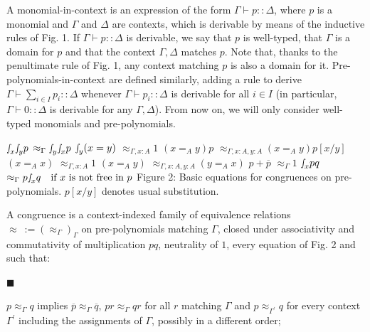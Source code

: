 \documentclass[10pt,a4paper]{amsart}
\begin{document}
 
 
A monomial-in-context is an expression of the form $\Gamma\vdash p::\Delta$, where $p$ is a monomial and $\Gamma$ and $\Delta$ are contexts, which is derivable by means of the inductive rules of Fig. 1. If $\Gamma\vdash p::\Delta$ is derivable, we say that $p$ is well-typed, that $\Gamma$ is a domain for $p$ and that the context $\Gamma,\Delta$ matches $p$. Note that, thanks to the penultimate rule of Fig. 1, any context matching $p$ is also a domain for it. Pre-polynomials-in-context are defined similarly, adding a rule to derive $\Gamma\vdash\sum_{i\in I}p_{i}::\Delta$ whenever $\Gamma\vdash p_{i}::\Delta$ is derivable for all $i\in I$ (in particular, $\Gamma\vdash 0::\Delta$ is derivable for any $\Gamma,\Delta$). From now on, we will only consider well-typed monomials and pre-polynomials.\par
 
 
    $\displaystyle{\smallint\!}_{x}{\smallint\!}_{y}p$ $\displaystyle\approx_{\Gamma}{\smallint\!}_{y}{\smallint\!}_{x}p$ $\displaystyle{\smallint\!}_{y}(x=y)$ $\displaystyle\approx_{\Gamma,x:A}1$     $\displaystyle(x=_{A}y)p$ $\displaystyle\approx_{\Gamma,x:A,y:A}(x=_{A}y)p[x/y]$ $\displaystyle(x=_{A}x)$ $\displaystyle\approx_{\Gamma,x:A}1$     $\displaystyle(x=_{A}y)$ $\displaystyle\approx_{\Gamma,x:A,y:A}(y=_{A}x)$ $\displaystyle p+\overline{p}$ $\displaystyle\approx_{\Gamma}1$     $\displaystyle{\smallint\!}_{x}pq$ $\displaystyle\approx_{\Gamma}p{\smallint\!}_{x}q\quad\text{if $x$ is not free %
in $p$}$    
Figure 2: Basic equations for congruences on pre-polynomials. $p[x/y]$ denotes usual substitution.\par
 
 
 
A congruence is a context-indexed family of equivalence relations $\approx\ :=(\approx_{\Gamma})_{\Gamma}$ on pre-polynomials matching $\Gamma$, closed under associativity and commutativity of multiplication $pq$, neutrality of $1$, every equation of Fig. 2 and such that:\par
  
\par\noindent  $\blacksquare$ 
 
$p\approx_{\Gamma}q$ implies $\overline{p}\approx_{\Gamma}\overline{q}$, $pr\approx_{\Gamma}qr$ for all $r$ matching $\Gamma$ and $p\approx_{\Gamma^{\prime}}q$ for every context $\Gamma^{\prime}$ including the assignments of $\Gamma$, possibly in a different order;\par
 
\end{document}
